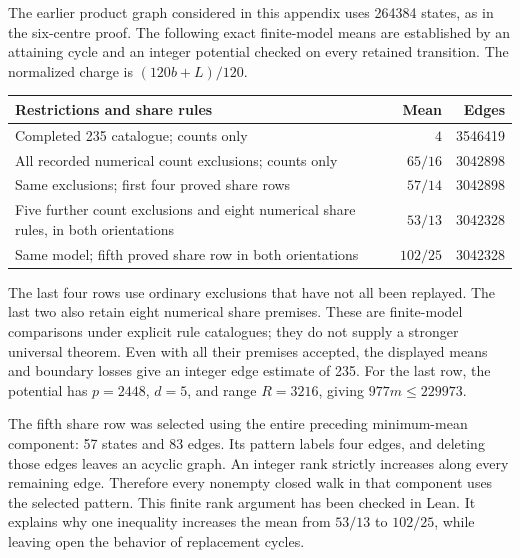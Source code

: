 \documentclass[11pt,a4paper]{article}
\theoremstyle{definition}
\theoremstyle{remark}
\begin{document}
The earlier product graph considered in this appendix uses 264384 states, as in the six-centre proof. The following exact finite-model means are established by an attaining cycle and an integer potential checked on every retained transition. The normalized charge is $(120b+L)/120$.
\begin{center}
\begin{tabular}{p{}rr}
\toprule
Restrictions and share rules & Mean & Edges\\\midrule
Completed 235 catalogue; counts only & $4$ & 3546419\\
All recorded numerical count exclusions; counts only & $65/16$ & 3042898\\
Same exclusions; first four proved share rows & $57/14$ & 3042898\\
Five further count exclusions and eight numerical share rules, in both orientations & $53/13$ & 3042328\\
Same model; fifth proved share row in both orientations & $102/25$ & 3042328\\
\bottomrule
\end{tabular}
\end{center}
The last four rows use ordinary exclusions that have not all been replayed. The last two also retain eight numerical share premises. These are finite-model comparisons under explicit rule catalogues; they do not supply a stronger universal theorem. Even with all their premises accepted, the displayed means and boundary losses give an integer edge estimate of 235. For the last row, the potential has $p=2448$, $d=5$, and range $R=3216$, giving $977m\le229973$.

The fifth share row was selected using the entire preceding minimum-mean component: 57 states and 83 edges. Its pattern labels four edges, and deleting those edges leaves an acyclic graph. An integer rank strictly increases along every remaining edge. Therefore every nonempty closed walk in that component uses the selected pattern. This finite rank argument has been checked in Lean. It explains why one inequality increases the mean from $53/13$ to $102/25$, while leaving open the behavior of replacement cycles.
\end{document}
